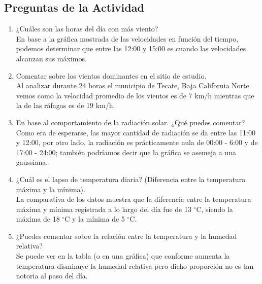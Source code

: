 \subsection{Preguntas de la Actividad}
\begin{enumerate}
\item ¿Cuáles son las horas del día con más viento?
\medskip
\\ En base a la gráfica mostrada de las velocidades en función del tiempo, podemos determinar que entre las 12:00 y 15:00 es cuando las velocidades alcanzan sus máximos.

\item Comentar sobre los vientos dominantes en el sitio de estudio.
\medskip
\\ Al analizar durante 24 horas el municipio de Tecate, Baja California Norte vemos como la velocidad promedio de los vientos es de 7 km/h mientras que la de las ráfagas es de 19 km/h.

\item En base al comportamiento de la radiación solar. ¿Qué puedes comentar?
\medskip
\\ Como era de esperarse, las mayor cantidad de radiación se da entre las 11:00 y 12:00, por otro lado, la radiación es prácticamente nula de 00:00 - 6:00 y de 17:00 - 24:00; también podríamos decir que la gráfica se asemeja a una gaussiana.

\item ¿Cuál es el lapso de temperatura diaria? (Diferencia entre la temperatura máxima y la mínima).
\medskip
\\ La comparativa de los datos muestra que la diferencia entre la temperatura máxima y mínima registrada a lo largo del día fue de 13 $^{\circ}$C, siendo la máxima de 18 $^{\circ}$C y la mínima de 5 $^{\circ}$C.

\item ¿Puedes comentar sobre la relación entre la temperatura y la humedad relativa?
\medskip
\\ Se puede ver en la tabla (o en una gráfica) que conforme aumenta la temperatura disminuye la humedad relativa pero dicho proporción no es tan notoria al paso del día.

\end{enumerate}

